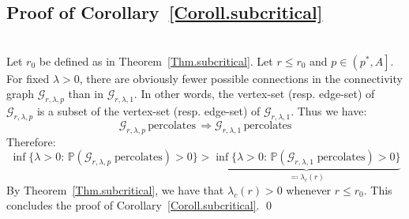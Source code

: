 \documentclass[10pt,a4paper]{amsart}
\theoremstyle{exampstyle}
\theoremstyle{exampnotations}
\begin{document}
\subsection{Proof of Corollary~\ref{Coroll.subcritical}}\mbox{}\\
Let $r_0$ be defined as in Theorem~\ref{Thm.subcritical}. Let $r \leq r_0$ and $p \in \left( p^{*},A \right]$. For fixed $\lambda > 0$, there are obviously fewer possible connections in the connectivity graph $\mathcal{G}_{r,\lambda,p}$ than in $\mathcal{G}_{r,\lambda,1}$. In other words, the vertex-set (resp. edge-set) of $\mathcal{G}_{r,\lambda,p}$ is a subset of the vertex-set (resp. edge-set) of $\mathcal{G}_{r, \lambda,1}$. Thus we have:
\begin{equation*}
    \mathcal{G}_{r, \lambda,p} \, \text{percolates} \,  \Rightarrow \mathcal{G}_{r, \lambda,1} \, \text{percolates}
\end{equation*}
Therefore:
\begin{equation*}
    \inf \lbrace \lambda > 0 : \, \mathbb{P}(\mathcal{G}_{r, \lambda, p} \; \text{percolates}) > 0 \rbrace >   \underbrace{\inf \lbrace \lambda > 0 : \, \mathbb{P}(\mathcal{G}_{r, \lambda, 1} \; \text{percolates}) > 0 \rbrace}_{ \eqqcolon \lambda_c(r)}
\end{equation*}
By Theorem~\ref{Thm.subcritical}, we have that $\lambda_c(r) > 0$ whenever $r \leq r_0$. This concludes the proof of Corollary~\ref{Coroll.subcritical}. \qed
\end{document}
